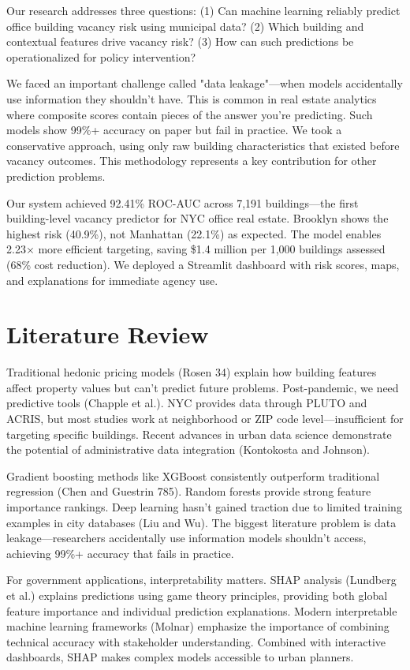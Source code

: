 \documentclass[12pt,letterpaper]{article}
\begin{document}
Our research addresses three questions: (1) Can machine learning reliably predict office building vacancy risk using municipal data? (2) Which building and contextual features drive vacancy risk? (3) How can such predictions be operationalized for policy intervention?

We faced an important challenge called "data leakage"—when models accidentally use information they shouldn't have. This is common in real estate analytics where composite scores contain pieces of the answer you're predicting. Such models show 99\%+ accuracy on paper but fail in practice. We took a conservative approach, using only raw building characteristics that existed before vacancy outcomes. This methodology represents a key contribution for other prediction problems.

Our system achieved 92.41\% ROC-AUC across 7,191 buildings—the first building-level vacancy predictor for NYC office real estate. Brooklyn shows the highest risk (40.9\%), not Manhattan (22.1\%) as expected. The model enables 2.23× more efficient targeting, saving \$1.4 million per 1,000 buildings assessed (68\% cost reduction). We deployed a Streamlit dashboard with risk scores, maps, and explanations for immediate agency use.

\section*{Literature Review}

Traditional hedonic pricing models (Rosen 34) explain how building features affect property values but can't predict future problems. Post-pandemic, we need predictive tools (Chapple et al.). NYC provides data through PLUTO and ACRIS, but most studies work at neighborhood or ZIP code level—insufficient for targeting specific buildings. Recent advances in urban data science demonstrate the potential of administrative data integration (Kontokosta and Johnson).

Gradient boosting methods like XGBoost consistently outperform traditional regression (Chen and Guestrin 785). Random forests provide strong feature importance rankings. Deep learning hasn't gained traction due to limited training examples in city databases (Liu and Wu). The biggest literature problem is data leakage—researchers accidentally use information models shouldn't access, achieving 99\%+ accuracy that fails in practice.

For government applications, interpretability matters. SHAP analysis (Lundberg et al.) explains predictions using game theory principles, providing both global feature importance and individual prediction explanations. Modern interpretable machine learning frameworks (Molnar) emphasize the importance of combining technical accuracy with stakeholder understanding. Combined with interactive dashboards, SHAP makes complex models accessible to urban planners.
\end{document}
